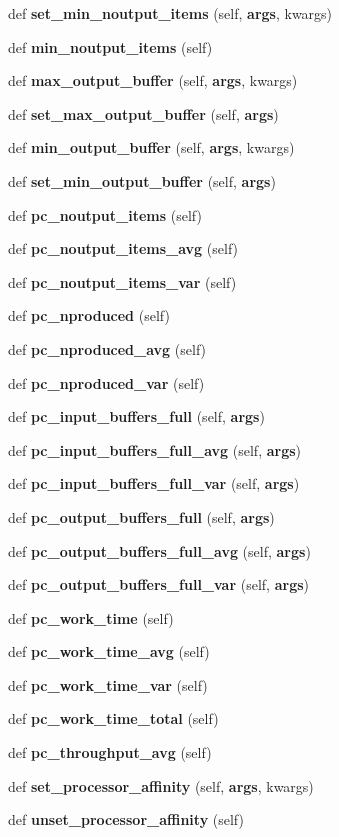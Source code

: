 \begin{DoxyCompactItemize}
def {\bf set\+\_\+min\+\_\+noutput\+\_\+items} (self, {\bf args}, kwargs)
\item 
def {\bf min\+\_\+noutput\+\_\+items} (self)
\item 
def {\bf max\+\_\+output\+\_\+buffer} (self, {\bf args}, kwargs)
\item 
def {\bf set\+\_\+max\+\_\+output\+\_\+buffer} (self, {\bf args})
\item 
def {\bf min\+\_\+output\+\_\+buffer} (self, {\bf args}, kwargs)
\item 
def {\bf set\+\_\+min\+\_\+output\+\_\+buffer} (self, {\bf args})
\item 
def {\bf pc\+\_\+noutput\+\_\+items} (self)
\item 
def {\bf pc\+\_\+noutput\+\_\+items\+\_\+avg} (self)
\item 
def {\bf pc\+\_\+noutput\+\_\+items\+\_\+var} (self)
\item 
def {\bf pc\+\_\+nproduced} (self)
\item 
def {\bf pc\+\_\+nproduced\+\_\+avg} (self)
\item 
def {\bf pc\+\_\+nproduced\+\_\+var} (self)
\item 
def {\bf pc\+\_\+input\+\_\+buffers\+\_\+full} (self, {\bf args})
\item 
def {\bf pc\+\_\+input\+\_\+buffers\+\_\+full\+\_\+avg} (self, {\bf args})
\item 
def {\bf pc\+\_\+input\+\_\+buffers\+\_\+full\+\_\+var} (self, {\bf args})
\item 
def {\bf pc\+\_\+output\+\_\+buffers\+\_\+full} (self, {\bf args})
\item 
def {\bf pc\+\_\+output\+\_\+buffers\+\_\+full\+\_\+avg} (self, {\bf args})
\item 
def {\bf pc\+\_\+output\+\_\+buffers\+\_\+full\+\_\+var} (self, {\bf args})
\item 
def {\bf pc\+\_\+work\+\_\+time} (self)
\item 
def {\bf pc\+\_\+work\+\_\+time\+\_\+avg} (self)
\item 
def {\bf pc\+\_\+work\+\_\+time\+\_\+var} (self)
\item 
def {\bf pc\+\_\+work\+\_\+time\+\_\+total} (self)
\item 
def {\bf pc\+\_\+throughput\+\_\+avg} (self)
\item 
def {\bf set\+\_\+processor\+\_\+affinity} (self, {\bf args}, kwargs)
\item 
def {\bf unset\+\_\+processor\+\_\+affinity} (self)
\item 

\end{DoxyCompactItemize}
